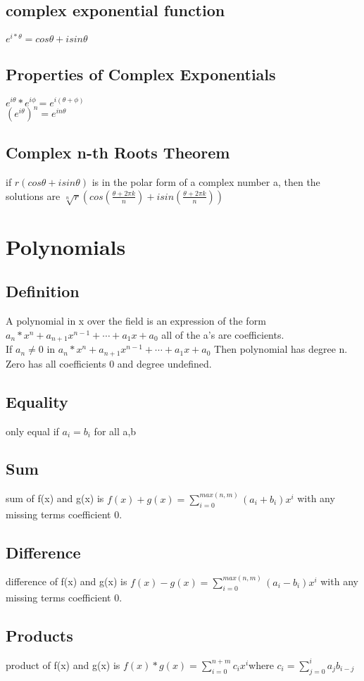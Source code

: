 \documentclass[12pt]{article}
\begin{document}
\subsection{complex exponential function}
$e^{i*\theta}= cos\theta+isin\theta$
\subsection{Properties of Complex Exponentials}
$e^{i\theta}*e^{i\phi}=e^{i(\theta+\phi)}$\\
$(e^{i\theta})^n=e^{in\theta}$
\subsection{Complex n-th Roots Theorem}
if $r(cos\theta + isin\theta)$ is in the polar form of a complex number a, then
the solutions are $\sqrt[n]{r}(cos(\frac{\theta + 2\pi
  k}{n})+isin(\frac{\theta+2\pi k}{n}))$
\section{Polynomials}
\subsection{Definition}
A polynomial in x over the field  is an expression of the form
$a_n*x^n + a_{n+1}x^{n-1} + \cdots +a_1x+a_0$ all of the a's are
coefficients.\\
If $a_n\neq0$ in $a_n*x^n + a_{n+1}x^{n-1} + \cdots +a_1x+a_0$ Then  polynomial
has degree n. Zero has all coefficients 0 and degree undefined.
\subsection{Equality}
only equal if $a_i=b_i$ for all a,b
\subsection{Sum}
sum of f(x) and g(x) is $f(x)+g(x)=\sum_{i=0}^{max(n,m)}(a_i+b_i)x^i$ with any
missing terms coefficient 0.
\subsection{Difference}
difference of f(x) and g(x) is $f(x)-g(x)=\sum_{i=0}^{max(n,m)}(a_i-b_i)x^i$ with any
missing terms coefficient 0.
\subsection{Products}
product of f(x) and g(x) is $f(x)*g(x)=\sum_{i=0}^{n+m}c_ix^i$where
$c_i=\sum_{j=0}^{i} a_jb_{i-j}$
\end{document}

